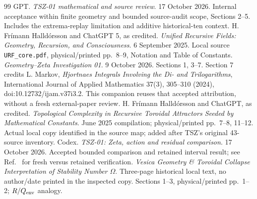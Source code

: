 \begin{thebibliography}{99}
 GPT. \emph{TSZ-01 mathematical and source review}. 17 October 2026. Internal acceptance within finite geometry and bounded source-audit scope, Sections 2--5. Includes the extrema-replay limitation and additive historical-ten context.
 H. Fr\'imann Halld\'orsson and ChatGPT 5, as credited. \emph{Unified Recursive Fields: Geometry, Recursion, and Consciousness}. 6 September 2025. Local source \texttt{URF\_core.pdf}, physical/printed pp.~8--9, Notation and Table of Constants.
 \emph{Geometry--Zeta Investigation 01}. 9 October 2026. Sections 1, 3--7. Section 7 credits L. Markov, \emph{Hjortnaes Integrals Involving the Di- and Trilogarithms}, International Journal of Applied Mathematics 37(3), 305--310 (2024), doi:10.12732/ijam.v37i3.2. This companion reuses that accepted attribution, without a fresh external-paper review.
 H. Fr\'imann Halld\'orsson and ChatGPT, as credited. \emph{Topological Complexity in Recursive Toroidal Attractors Seeded by Mathematical Constants}. June 2025 compilation; physical/printed pp.~7--8, 11--12. Actual local copy identified in the source map; added after TSZ's original 43-source inventory.
 Codex. \emph{TSZ-01: Zeta, action and residual comparison}. 17 October 2026. Accepted bounded comparison and retained interval result; see Ref.~\cite{TSZReview} for fresh versus retained verification.
 \emph{Vesica Geometry \& Toroidal Collapse Interpretation of Stability Number $\Omega$}. Three-page historical local text, no author/date printed in the inspected copy. Sections 1--3, physical/printed pp.~1--2; $R/Q_{\rm env}$ analogy.
\end{thebibliography}
